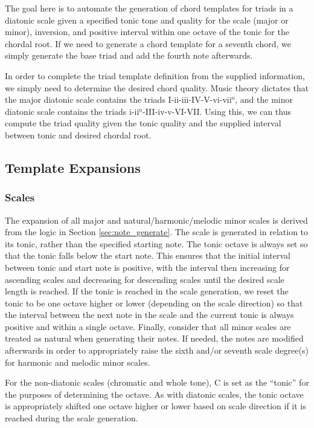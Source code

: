 \documentclass{article}
\begin{document}
The goal here is to automate the generation of chord templates for triads in a diatonic scale given a specified tonic tone and quality for the scale (major or minor), inversion, and positive interval within one octave of the tonic for the chordal root. If we need to generate a chord template for a seventh chord, we simply generate the base triad and add the fourth note afterwards. 

In order to complete the triad template definition from the supplied information, we simply need to determine the desired chord quality. Music theory dictates that the major diatonic scale contains the triads  I-ii-iii-IV-V-vi-vii$^\text{o}$, and the minor diatonic scale contains the triads i-ii$^\text{o}$-III-iv-v-VI-VII. Using this, we can thus compute the triad quality given the tonic quality and the supplied interval between tonic and desired chordal root.

\subsection{Template Expansions}
\subsubsection{Scales}
The expansion of all major and natural/harmonic/melodic minor scales is derived from the logic in Section \ref{sec:note_generate}. The scale is generated in relation to its tonic, rather than the specified starting note. The tonic octave is always set so that the tonic falls below the start note. This ensures that the initial interval between tonic and start note is positive, with the interval then increasing for ascending scales and decreasing for descending scales until the desired scale length is reached. If the tonic is reached in the scale generation, we reset the tonic to be one octave higher or lower (depending on the scale direction) so that the interval between the next note in the scale and the current tonic is always positive and within a single octave. Finally, consider that all minor scales are treated as natural when generating their notes. If needed, the notes are modified afterwards in order to appropriately raise the sixth and/or seventh scale degree(s) for harmonic and melodic minor scales. 

For the non-diatonic scales (chromatic and whole tone), C is set as the “tonic” for the purposes of determining the octave. As with diatonic scales, the tonic octave is appropriately shifted one octave higher or lower based on scale direction if it is reached during the scale generation.
\end{document}
